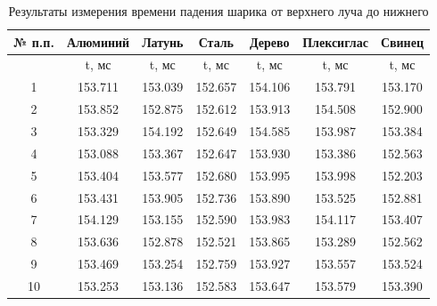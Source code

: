 \begin{center}
\begin{table}[H]
\centering
\caption{Результаты измерения времени падения шарика от верхнего луча до нижнего}

\label{table:t1}
\begin{tabular}{|c|c|c|c|c|c|c|}
\hline

№ п.п. &Алюминий&Латунь&Сталь&Дерево&Плексиглас&Свинец\\
\hline
{}&t, мс&t, мс&t, мс&t, мс&t, мс&t, мс\\
\hline
1 & 153.711 & 153.039 & 152.657 & 154.106 & 153.791 & 153.170 \\
2 & 153.852 & 152.875 & 152.612 & 153.913 & 154.508 & 152.900 \\
3 & 153.329 & 154.192 & 152.649 & 154.585 & 153.987 & 153.384 \\
4 & 153.088 & 153.367 & 152.647 & 153.930 & 153.386 & 152.563 \\
5 & 153.404 & 153.577 & 152.680 & 153.995 & 153.998 & 152.203\\
6 & 153.431 & 153.905 & 152.736 & 153.890 & 153.525 & 152.881 \\
7 & 154.129 & 153.155 & 152.590 & 153.983 & 154.117 & 153.407 \\
8 & 153.636 & 152.878 & 152.521 & 153.865 & 153.289 & 152.562 \\
9 & 153.469 & 153.254 & 152.759 & 153.927 & 153.557 & 153.524 \\
10 & 153.253 & 153.136 & 152.583 & 153.647 & 153.579 & 153.390 \\
\hline
\end{tabular}
\end{table}
\end{center}
